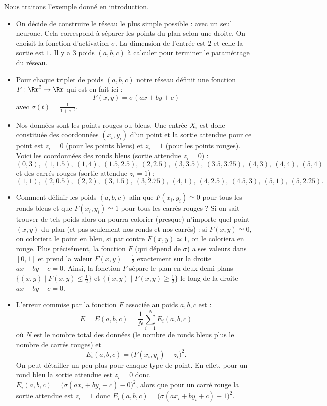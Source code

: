 \documentclass[11pt,class=report,crop=false]{standalone}
\begin{document}
\begin{exemple}
Nous traitons l'exemple donné en introduction.
\begin{itemize}
  \item On décide de construire le réseau le plus simple possible : avec un seul neurone. Cela correspond à séparer les points du plan selon une droite.
  On choisit la fonction d'activation $\sigma$.
  La dimension de l'entrée est $2$ et celle la sortie est $1$.
  Il y a $3$ poids $(a,b,c)$ à calculer pour terminer le paramétrage du réseau.


  \item Pour chaque triplet de poids $(a,b,c)$ notre réseau définit une fonction $F : \Rr^2 \to \Rr$
  qui est en fait ici :
  $$F(x,y) = \sigma(ax+by+c)$$
  avec $\sigma(t) = \frac{1}{1+e^{-t}}$.
  
  
    
  \item Nos données sont les points rouges ou bleus.
  Une entrée $X_i$ est donc constituée des coordonnées $(x_i,y_i)$ d'un point et la sortie attendue pour ce point est $z_i = 0$ (pour les points bleus) et $z_i = 1$ (pour les points rouges).
  Voici les coordonnées des ronds bleus (sortie attendue $z_i = 0$) :
  $$(0,3),\ (1,1.5),\ (1,4),\ (1.5,2.5),\ (2,2.5),\ (3,3.5),\ (3.5,3.25),\ (4,3),\ (4,4),\ (5,4)$$
  et des carrés rouges (sortie attendue $z_i = 1$) :
  $$(1,1),\ (2,0.5),\ (2,2),\ (3,1.5),\ (3,2.75),\ (4,1),\ (4,2.5),\ (4.5,3),\ (5,1),\ (5,2.25).$$  
  
 
  \item Comment définir les poids $(a,b,c)$ afin que $F(x_i,y_i) \simeq 0$ pour tous les ronds bleus et que $F(x_i,y_i)\simeq1$ pour tous les carrés rouges ? Si on sait trouver de tels poids alors on pourra colorier (presque) n'importe quel point $(x,y)$ du plan (et pas seulement nos ronds et nos carrés) : si $F(x,y) \simeq 0$, on coloriera le point en bleu, si par contre $F(x,y) \simeq 1$, on le coloriera en rouge.
  Plus précisément, la fonction $F$ (qui dépend de $\sigma$) a ses valeurs dans $[0,1]$ et prend la valeur $F(x,y)=\frac12$ exactement sur la droite $ax+by+c=0$. Ainsi, la fonction $F$ sépare le plan en deux demi-plans $\{ (x,y) \mid F(x,y)\le\frac12\}$ et $\{ (x,y) \mid F(x,y)\ge\frac12\}$ le long de la droite $ax+by+c=0$.

  \item L'erreur commise par la fonction $F$ associée au poids $a,b,c$ est :
  $$E = E(a,b,c) = \frac{1}N \sum_{i=1}^N E_i(a,b,c)$$
  où $N$ est le nombre total des données (le nombre de ronds bleus plus le nombre de carrés rouges)
  et 
  $$E_i(a,b,c) = \big( F(x_i,y_i) - z_i \big)^2.$$
  On peut détailler un peu plus pour chaque type de point.
  En effet, pour un rond bleu la sortie attendue est $z_i=0$ donc $E_i(a,b,c) = \big( \sigma(a x_i + b y_i + c) - 0 \big)^2$, alors que pour un carré rouge la sortie attendue est $z_i=1$ donc $E_i(a,b,c) = \big( \sigma(a x_i + b y_i + c) - 1 \big)^2$.
  
\end{itemize}
\end{exemple}
  
\end{document}
